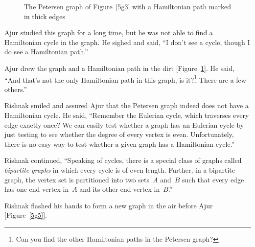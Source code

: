 \begin{figure}
\begin{center}
\caption{The Petersen graph of Figure~\ref{5g3} with a Hamiltonian path marked in thick edges}\label{5g4}
\end{center}
\end{figure}

Ajur studied this graph for a long time, but he was not able to find a Hamiltonian cycle in the graph. He sighed and said, ``I don't see a cycle, though I do see a Hamiltonian path.''

Ajur drew the graph and a Hamiltonian path in the dirt [Figure~\ref{5g4}]. He said,  ``And that's not the only Hamiltonian path in this graph, is it?\footnote{Can you find the other Hamiltonian paths in the Petersen graph?} There are a few others.''

Rishnak smiled and assured Ajur that the Petersen graph indeed does not have a Hamiltonian cycle. He said, ``Remember the Eulerian cycle, which traverses every edge exactly once? We can easily test whether a graph has an Eulerian cycle by just testing to see whether the degree of every vertex is even. Unfortunately, there is no easy way to test whether a given graph has a Hamiltonian cycle.''

Rishnak continued, ``Speaking of cycles, there is a special class of graphs called \textit{bipartite graphs} in which every cycle is of even length. Further, in a bipartite graph, the vertex set is partitioned into two sets~$A$ and~$B$ such that every edge has one end vertex in~$A$ and its other end vertex in~$B$.''

Rishnak flashed his hands to form a new graph in the air before Ajur [Figure~\ref{5g5}].

